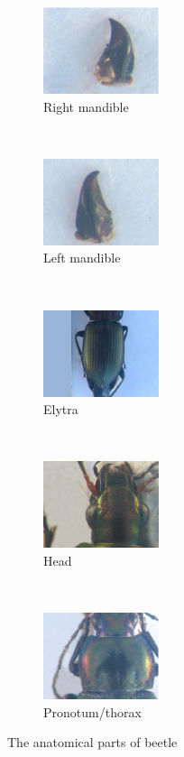 \documentclass{article} %
\begin{document}
\begin{multicols}{2}
\begin{figure}[H]
    \centering
    \begin{subfigure}[t]{0.23\textwidth}
        \centering
        \includegraphics[height=1in]{images/md19.eps}
        \caption{Right mandible}
        \label{figsub01}
    \end{subfigure}%
    ~ 
    \begin{subfigure}[t]{0.23\textwidth}
        \centering
        \includegraphics[height=1in]{images/mg019.JPG}
        \caption{Left mandible }
        \label{figsub02}
    \end{subfigure}~\\
    \begin{subfigure}[t]{0.23\textwidth}
        \centering
        \includegraphics[height=1in]{images/elytre107.JPG}
        \caption{Elytra}
        \label{figsub03}
    \end{subfigure}%
    ~ 
    \begin{subfigure}[t]{0.23\textwidth}
        \centering
        \includegraphics[height=1in]{images/tete081.JPG}
        \caption{Head }
        \label{figsub04}
    \end{subfigure}~\\
    \begin{subfigure}[t]{0.23\textwidth}
        \centering
        \includegraphics[height=1in]{images/prono60.eps}
        \caption{Pronotum/thorax }
        \label{figsub05}
    \end{subfigure}
    \caption{The anatomical parts of beetle}
    \label{fig1}
\end{figure}


\end{multicols}
\end{document}
